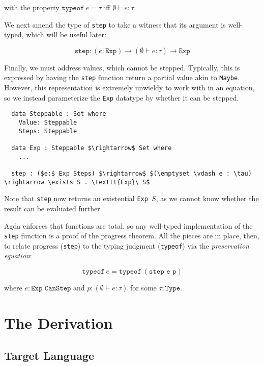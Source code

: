 \documentclass[manuscript,screen,review,sigplan]{acmart}
\begin{document}
with the property $\texttt{typeof}\ e = \tau$ iff $\emptyset \vdash e : \tau$.

We next amend the type of \texttt{step} to take a witness that its argument
is well-typed, which will be useful later:

\begin{equation}
  \texttt{step} : (e: \texttt{Exp}) \rightarrow (\emptyset \vdash e : \tau)
    \rightarrow \texttt{Exp}
\end{equation}

Finally, we must address values, which cannot be stepped. Typically, this is
expressed by having the \texttt{step} function return a partial value akin to
\texttt{Maybe}. However, this representation is extremely unwieldy to work with
in an equation, so we instead parameterize the \texttt{Exp} datatype by whether
it can be stepped.

\begin{lstlisting}
  data Steppable : Set where
    Value: Steppable
    Steps: Steppable

  data Exp : Steppable $\rightarrow$ Set where
    ...

  step : ($e:$ Exp Steps) $\rightarrow$ $(\emptyset \vdash e : \tau) \rightarrow \exists S . \texttt{Exp}\ S$
\end{lstlisting}

Note that \texttt{step} now returns an existential \texttt{Exp }$S$, as we
cannot know whether the result can be evaluated further.

Agda enforces that functions are total, so any well-typed implementation of the
\texttt{step} function is a proof of the progress theorem. All the pieces are
in place, then, to relate progress (\texttt{step}) to the typing judgment
(\texttt{typeof}) via the \emph{preservation equation}:

\begin{equation}
  \texttt{typeof}\ e = \texttt{typeof}\ (\texttt{step e p})
\end{equation}

where $e : \texttt{Exp CanStep}$ and $p : (\emptyset \vdash e : \tau)$ for some
$\tau : \texttt{Type}$.

\section{The Derivation}

\subsection{Target Language}
\end{document}

